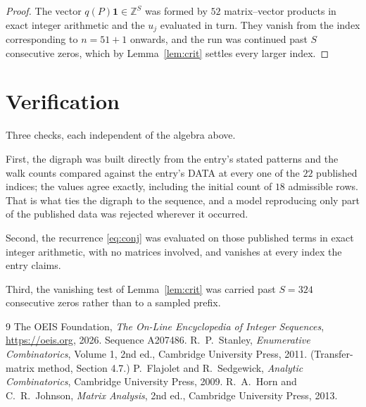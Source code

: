 \documentclass[11pt,a4paper]{article}
\theoremstyle{plain}
\theoremstyle{definition}
\begin{document}
\begin{proof}
The vector $q(P)\mathbf{1}\in\mathbb{Z}^{S}$ was formed by $52$ matrix--vector
products in exact integer arithmetic and the $u_j$ evaluated in turn. They vanish from the
index corresponding to $n=51+1$ onwards, and the run was continued past $S$ consecutive
zeros, which by Lemma~\ref{lem:crit} settles every larger index.
\end{proof}

\section{Verification}

Three checks, each independent of the algebra above.

First, the digraph was built directly from the entry's stated patterns and the walk counts
compared against the entry's DATA at every one of the $22$ published indices; the
values agree exactly, including the initial count of $18$ admissible rows. That is
what ties the digraph to the sequence, and a model reproducing only part of the published
data was rejected wherever it occurred.

Second, the recurrence \eqref{eq:conj} was evaluated on those published terms in exact
integer arithmetic, with no matrices involved, and vanishes at every index the entry claims.

Third, the vanishing test of Lemma~\ref{lem:crit} was carried past $S=324$ consecutive
zeros rather than to a sampled prefix.

\begin{thebibliography}{9}
 The OEIS Foundation, \emph{The On-Line Encyclopedia of Integer
Sequences}, \url{https://oeis.org}, 2026. Sequence A207486.
 R.~P.~Stanley, \emph{Enumerative Combinatorics}, Volume 1, 2nd ed.,
Cambridge University Press, 2011. (Transfer-matrix method, Section 4.7.)
 P.~Flajolet and R.~Sedgewick, \emph{Analytic Combinatorics}, Cambridge
University Press, 2009.
 R.~A.~Horn and C.~R.~Johnson, \emph{Matrix Analysis}, 2nd ed., Cambridge
University Press, 2013.
\end{thebibliography}
\end{document}
